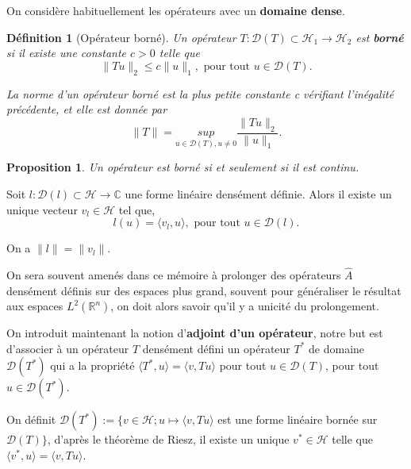 \documentclass[a4paper, 12pt]{report}
\newcommand{\R}{\mathbb{R}} %
\newcommand{\ra}[1][]{\overset{#1}{\rightarrow}} %
\renewcommand{\.}{\cdot} %
\theoremstyle{break}
\newtheorem{definition}{Définition}
\newtheorem{proposition}{Proposition}
\theoremstyle{remark}
\theoremstyle{proofstyle}
\begin{document}
On considère habituellement les opérateurs avec un \textbf{domaine dense}.

\begin{definition}[Opérateur borné]
    Un opérateur $T : \mathcal{D} (T) \subset \mathcal{H}_1 \ra \mathcal{H}_2$ est \textbf{borné} si il existe une constante $c > 0$ telle que
    $$\|T u\|_2 \leq c \|u\|_1, \text{ pour tout }u \in \mathcal{D}(T).$$

    La norme d'un opérateur borné est la plus petite constante c vérifiant l'inégalité précédente, et elle est donnée par
    $$\| T \| = \underset{u \in \mathcal{D} (T), u \neq 0}{sup} \frac{\|T u\|_2}{\|u\|_1}.$$
\end{definition}

\begin{proposition}
    Un opérateur est borné si et seulement si il est continu.
\end{proposition}\vspace{5pt}

\begin{theorem}
    Soit $l : \mathcal{D}(l) \subset \mathcal{H} \ra \mathbb{C}$ une forme linéaire densément définie. Alors il existe un unique vecteur $v_l \in \mathcal{H}$ tel que,
    $$l(u) = \langle v_l, u \rangle, \text{ pour tout } u \in \mathcal{D}(l).$$

    On a $\|l\|=\|v_l\|$.
\end{theorem}\vspace{5pt}

On sera souvent amenés dans ce mémoire à prolonger des opérateurs $\hat{A}$ densément définis sur des espaces plus grand, souvent pour généraliser le résultat aux espaces $L^2(\R^n)$, on doit alors savoir qu'il y a unicité du prolongement. \vspace{7pt}


On introduit maintenant la notion d'\textbf{adjoint d'un opérateur}, notre but est d'associer à un opérateur $T$ densément défini un opérateur $T^*$ de domaine $\mathcal{D}(T^*)$ qui a la propriété $\langle T^*, u \rangle = \langle v, T u \rangle$ pour tout $u \in \mathcal{D} (T)$, pour tout $u \in \mathcal{D}(T^*)$. \vspace{5pt}

On définit $\mathcal{D}(T^*) := \{ v \in \mathcal{H} ; u \mapsto \langle v, T u \rangle$ est une forme linéaire bornée sur $\mathcal{D}(T)\}$, d'après le théorème de Riesz, il existe un unique $v^* \in \mathcal{H}$ telle que $\langle v^*, u \rangle = \langle v, Tu \rangle$.
\end{document}
